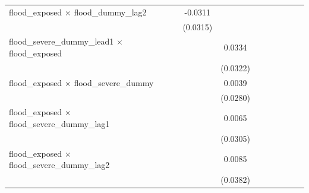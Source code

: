 \begin{tabular}{lcccccccc}
   flood\_exposed $\times$ flood\_dummy\_lag2                         & -0.0311               &                       &                       &                       &                       &                       &                       &   \\   
                                                                      & (0.0315)              &                       &                       &                       &                       &                       &                       &   \\   
   flood\_severe\_dummy\_lead1 $\times$ flood\_exposed                &                       & 0.0334                &                       &                       &                       &                       &                       &   \\   
                                                                      &                       & (0.0322)              &                       &                       &                       &                       &                       &   \\   
   flood\_exposed $\times$ flood\_severe\_dummy                       &                       & 0.0039                &                       &                       &                       &                       &                       &   \\   
                                                                      &                       & (0.0280)              &                       &                       &                       &                       &                       &   \\   
   flood\_exposed $\times$ flood\_severe\_dummy\_lag1                 &                       & 0.0065                &                       &                       &                       &                       &                       &   \\   
                                                                      &                       & (0.0305)              &                       &                       &                       &                       &                       &   \\   
   flood\_exposed $\times$ flood\_severe\_dummy\_lag2                 &                       & 0.0085                &                       &                       &                       &                       &                       &   \\   
                                                                      &                       & (0.0382)              &                       &                       &                       &                       &                       &   \\   

\end{tabular}
